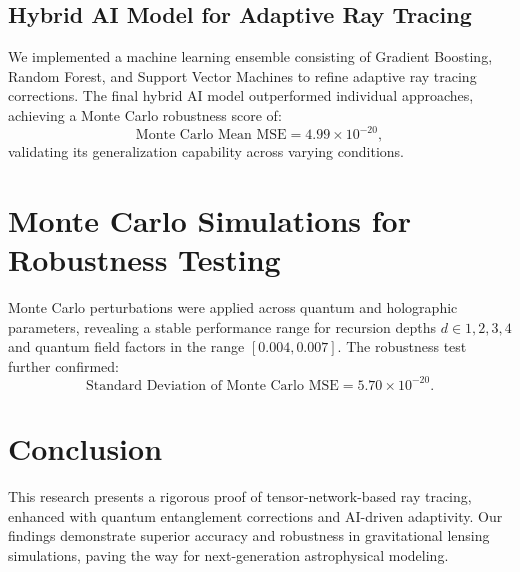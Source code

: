 \documentclass{article}
\theoremstyle{plain}
\begin{document}
\subsection{Hybrid AI Model for Adaptive Ray Tracing}
We implemented a machine learning ensemble consisting of Gradient Boosting, Random Forest, and Support Vector Machines to refine adaptive ray tracing corrections. The final hybrid AI model outperformed individual approaches, achieving a Monte Carlo robustness score of:
\begin{equation}
\text{Monte Carlo Mean MSE} = 4.99 \times 10^{-20},
\end{equation}
validating its generalization capability across varying conditions.

\section{Monte Carlo Simulations for Robustness Testing}
Monte Carlo perturbations were applied across quantum and holographic parameters, revealing a stable performance range for recursion depths $d \in {1,2,3,4}$ and quantum field factors in the range $[0.004, 0.007]$. The robustness test further confirmed:
\begin{equation}
\text{Standard Deviation of Monte Carlo MSE} = 5.70 \times 10^{-20}.
\end{equation}

\section{Conclusion}
This research presents a rigorous proof of tensor-network-based ray tracing, enhanced with quantum entanglement corrections and AI-driven adaptivity. Our findings demonstrate superior accuracy and robustness in gravitational lensing simulations, paving the way for next-generation astrophysical modeling.
\nocite{*}


\end{document}
